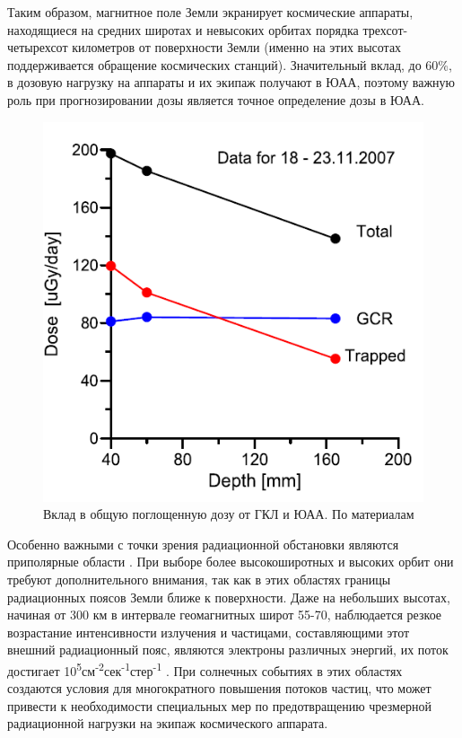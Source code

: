 

Таким образом, магнитное поле Земли экранирует космические аппараты, находящиеся на средних широтах и невысоких орбитах порядка трехсот-четырехсот километров от поверхности Земли (именно на этих высотах поддерживается обращение космических станций). Значительный вклад, до 60\%,  в дозовую нагрузку на аппараты и их экипаж получают в ЮАА, поэтому важную роль  при прогнозировании дозы является точное определение дозы в ЮАА\cite{lish2014, Lishnevskii2012}.

\begin{figure}
	\centering
	\includegraphics[width=0.7\linewidth]{images/liulinGCRSAA}
	\caption{Вклад в общую поглощенную дозу от ГКЛ и ЮАА. По материалам  \cite{Dachev2015}}
	\label{fig:liulingcrsaa}
\end{figure}

Особенно важными с точки зрения радиационной обстановки являются приполярные области \cite{gorchakov1961}. При выборе более высокоширотных и высоких орбит они требуют дополнительного внимания, так как в этих областях границы радиационных поясов Земли ближе к поверхности. Даже на небольших высотах, начиная от 300 км в интервале геомагнитных широт 55-70, наблюдается резкое возрастание интенсивности излучения и частицами, составляющими этот внешний радиационный пояс, являются электроны различных энергий, их поток достигает 10\textsuperscript{5}см\textsuperscript{-2}сек\textsuperscript{-1}стер\textsuperscript{-1} \cite{vernov1960}. При солнечных событиях в этих областях создаются условия для многократного повышения потоков частиц, что может привести к необходимости специальных мер по предотвращению чрезмерной радиационной нагрузки на экипаж космического аппарата.

